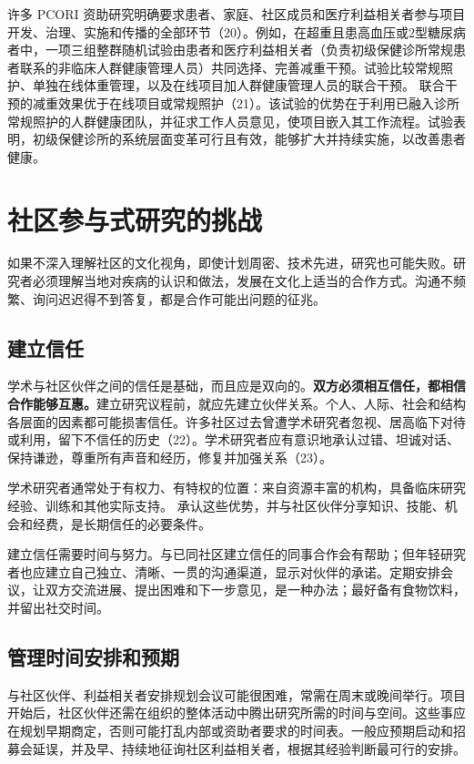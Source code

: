 许多 PCORI 资助研究明确要求患者、家庭、社区成员和医疗利益相关者参与项目开发、治理、实施和传播的全部环节（20）。例如，在超重且患高血压或2型糖尿病者中，一项三组整群随机试验由患者和医疗利益相关者（负责初级保健诊所常规患者联系的非临床人群健康管理人员）共同选择、完善减重干预。试验比较常规照护、单独在线体重管理，以及在线项目加人群健康管理人员的联合干预。
联合干预的减重效果优于在线项目或常规照护（21）。该试验的优势在于利用已融入诊所常规照护的人群健康团队，并征求工作人员意见，使项目嵌入其工作流程。试验表明，初级保健诊所的系统层面变革可行且有效，能够扩大并持续实施，以改善患者健康。

\section{社区参与式研究的挑战}
如果不深入理解社区的文化视角，即使计划周密、技术先进，研究也可能失败。研究者必须理解当地对疾病的认识和做法，发展在文化上适当的合作方式。沟通不频繁、询问迟迟得不到答复，都是合作可能出问题的征兆。

\subsection{建立信任}
学术与社区伙伴之间的信任是基础，而且应是双向的。\textbf{双方必须相互信任，都相信合作能够互惠。}建立研究议程前，就应先建立伙伴关系。个人、人际、社会和结构各层面的因素都可能损害信任。许多社区过去曾遭学术研究者忽视、居高临下对待或利用，留下不信任的历史（22）。学术研究者应有意识地承认过错、坦诚对话、保持谦逊，尊重所有声音和经历，修复并加强关系（23）。

学术研究者通常处于有权力、有特权的位置：来自资源丰富的机构，具备临床研究经验、训练和其他实际支持。
承认这些优势，并与社区伙伴分享知识、技能、机会和经费，是长期信任的必要条件。

建立信任需要时间与努力。与已同社区建立信任的同事合作会有帮助；但年轻研究者也应建立自己独立、清晰、一贯的沟通渠道，显示对伙伴的承诺。定期安排会议，让双方交流进展、提出困难和下一步意见，是一种办法；最好备有食物饮料，并留出社交时间。

\subsection{管理时间安排和预期}
与社区伙伴、利益相关者安排规划会议可能很困难，常需在周末或晚间举行。项目开始后，社区伙伴还需在组织的整体活动中腾出研究所需的时间与空间。这些事应在规划早期商定，否则可能打乱内部或资助者要求的时间表。一般应预期启动和招募会延误，并及早、持续地征询社区利益相关者，根据其经验判断最可行的安排。

